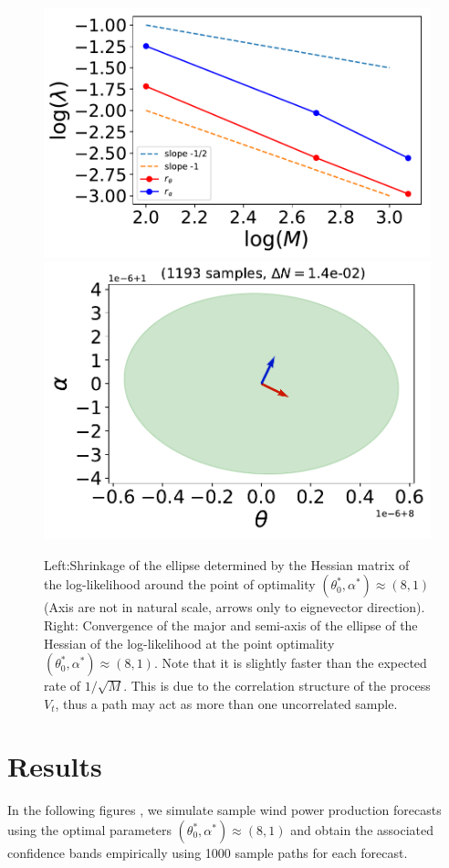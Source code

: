 \documentclass[ima, 20pt, portrait, plainboxedsections]{sciposter}
\begin{document}
\begin{multicols}{3}
\begin{figure}[t]
\begin{center}
    \includegraphics[width=0.6\linewidth]{ellipse_conv_samples_dN=14e-02.pdf}
   \includegraphics[width=0.6\linewidth]{ellipse1193_samples_dN=14e-02.pdf}
\end{center}
   \caption{Left:Shrinkage of the ellipse determined by the Hessian matrix of the log-likelihood around the point of optimality $(\theta_0^*, \alpha^*)\approx (8,1)$ (Axis are not in natural scale, arrows only to  eignevector direction). Right: Convergence of the major and semi-axis of the ellipse  of the Hessian of the log-likelihood at the point optimality $(\theta_0^*, \alpha^*)\approx (8,1)$. Note that it is slightly faster than the expected rate of $1/\sqrt{M}$. This is due to the correlation structure of the process $V_t$, thus a path may act  as more than one  uncorrelated sample.}
\label{ellipse_drawing}
\end{figure}


\section*{Results}
In the following figures , we simulate sample wind power production forecasts using the optimal parameters  $(\theta_0^*, \alpha^*)\approx (8,1)$ and obtain the associated confidence bands empirically using 1000 sample paths for each forecast.


\end{multicols}
\end{document}
